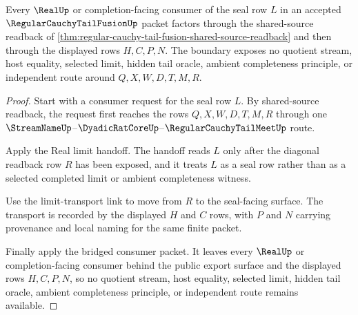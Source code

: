 \begin{theorem}
\label{thm:regular-cauchy-tail-fusion-real-seal-consumer-boundary}
Every $\RealUp$ or completion-facing consumer of the seal row $L$ in an accepted $\RegularCauchyTailFusionUp$ packet factors through the shared-source readback of \autoref{thm:regular-cauchy-tail-fusion-shared-source-readback} and then through the displayed rows $H,C,P,N$. The boundary exposes no quotient stream, host equality, selected limit, hidden tail oracle, ambient completeness principle, or independent route around $Q,X,W,D,T,M,R$.
\end{theorem}
\begin{proof}
Start with a consumer request for the seal row $L$. By shared-source readback, the request first reaches the rows $Q,X,W,D,T,M,R$ through one $\StreamNameUp$--$\DyadicRatCoreUp$--$\RegularCauchyTailMeetUp$ route.

Apply the Real limit handoff. The handoff reads $L$ only after the diagonal readback row $R$ has been exposed, and it treats $L$ as a seal row rather than as a selected completed limit or ambient completeness witness.

Use the limit-transport link to move from $R$ to the seal-facing surface. The transport is recorded by the displayed $H$ and $C$ rows, with $P$ and $N$ carrying provenance and local naming for the same finite packet.

Finally apply the bridged consumer packet. It leaves every $\RealUp$ or completion-facing consumer behind the public export surface and the displayed rows $H,C,P,N$, so no quotient stream, host equality, selected limit, hidden tail oracle, ambient completeness principle, or independent route remains available.
\end{proof}

